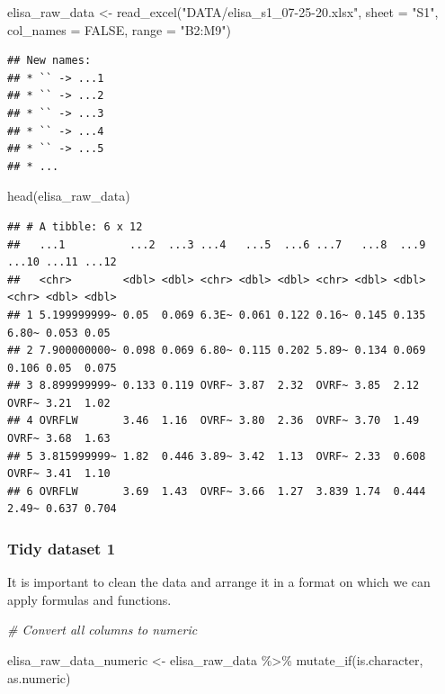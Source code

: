 \documentclass[
]{book}
\newenvironment{Shaded}{\begin{snugshade}}{\end{snugshade}}
\newcommand{\AttributeTok}[1]{\textcolor[rgb]{0.77,0.63,0.00}{#1}}
\newcommand{\CommentTok}[1]{\textcolor[rgb]{0.56,0.35,0.01}{\textit{#1}}}
\newcommand{\ConstantTok}[1]{\textcolor[rgb]{0.00,0.00,0.00}{#1}}
\newcommand{\FunctionTok}[1]{\textcolor[rgb]{0.00,0.00,0.00}{#1}}
\newcommand{\NormalTok}[1]{#1}
\newcommand{\OtherTok}[1]{\textcolor[rgb]{0.56,0.35,0.01}{#1}}
\newcommand{\SpecialCharTok}[1]{\textcolor[rgb]{0.00,0.00,0.00}{#1}}
\newcommand{\StringTok}[1]{\textcolor[rgb]{0.31,0.60,0.02}{#1}}
\begin{document}
\begin{Shaded}
\begin{Highlighting}[]
\NormalTok{elisa\_raw\_data }\OtherTok{\textless{}{-}} \FunctionTok{read\_excel}\NormalTok{(}\StringTok{"DATA/elisa\_s1\_07{-}25{-}20.xlsx"}\NormalTok{, }
                             \AttributeTok{sheet =} \StringTok{"S1"}\NormalTok{, }\AttributeTok{col\_names =} \ConstantTok{FALSE}\NormalTok{,  }
                             \AttributeTok{range =} \StringTok{"B2:M9"}\NormalTok{)}
\end{Highlighting}
\end{Shaded}

\begin{verbatim}
## New names:
## * `` -> ...1
## * `` -> ...2
## * `` -> ...3
## * `` -> ...4
## * `` -> ...5
## * ...
\end{verbatim}

\begin{Shaded}
\begin{Highlighting}[]
\FunctionTok{head}\NormalTok{(elisa\_raw\_data)}
\end{Highlighting}
\end{Shaded}

\begin{verbatim}
## # A tibble: 6 x 12
##   ...1          ...2  ...3 ...4   ...5  ...6 ...7   ...8  ...9 ...10 ...11 ...12
##   <chr>        <dbl> <dbl> <chr> <dbl> <dbl> <chr> <dbl> <dbl> <chr> <dbl> <dbl>
## 1 5.199999999~ 0.05  0.069 6.3E~ 0.061 0.122 0.16~ 0.145 0.135 6.80~ 0.053 0.05 
## 2 7.900000000~ 0.098 0.069 6.80~ 0.115 0.202 5.89~ 0.134 0.069 0.106 0.05  0.075
## 3 8.899999999~ 0.133 0.119 OVRF~ 3.87  2.32  OVRF~ 3.85  2.12  OVRF~ 3.21  1.02 
## 4 OVRFLW       3.46  1.16  OVRF~ 3.80  2.36  OVRF~ 3.70  1.49  OVRF~ 3.68  1.63 
## 5 3.815999999~ 1.82  0.446 3.89~ 3.42  1.13  OVRF~ 2.33  0.608 OVRF~ 3.41  1.10 
## 6 OVRFLW       3.69  1.43  OVRF~ 3.66  1.27  3.839 1.74  0.444 2.49~ 0.637 0.704
\end{verbatim}

\hypertarget{tidy-dataset-1}{%
\subsubsection{Tidy dataset 1}\label{tidy-dataset-1}}

It is important to clean the data and arrange it in a format on which we can apply formulas and functions.

\begin{Shaded}
\begin{Highlighting}[]
\CommentTok{\# Convert all columns to numeric}

\NormalTok{elisa\_raw\_data\_numeric }\OtherTok{\textless{}{-}}\NormalTok{ elisa\_raw\_data }\SpecialCharTok{\%\textgreater{}\%} 
  \FunctionTok{mutate\_if}\NormalTok{(is.character, as.numeric)}
\end{Highlighting}
\end{Shaded}
\end{document}
